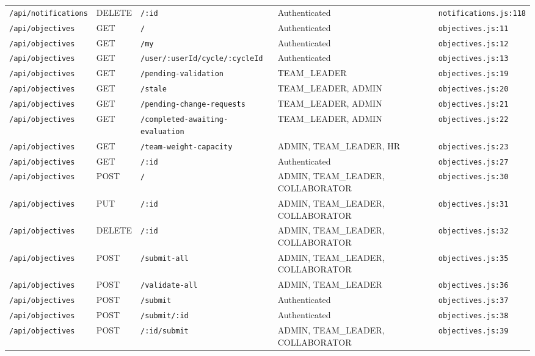 \begin{landscape}
\begin{longtable}{p{}p{}p{}p{}p{}}
\texttt{/api/notifications} & DELETE & \texttt{/:id} & Authenticated & \texttt{notifications.js:118}\\
\texttt{/api/objectives} & GET & \texttt{/} & Authenticated & \texttt{objectives.js:11}\\
\texttt{/api/objectives} & GET & \texttt{/my} & Authenticated & \texttt{objectives.js:12}\\
\texttt{/api/objectives} & GET & \texttt{/user/:userId/cycle/:cycleId} & Authenticated & \texttt{objectives.js:13}\\
\texttt{/api/objectives} & GET & \texttt{/pending-validation} & TEAM\_LEADER & \texttt{objectives.js:19}\\
\texttt{/api/objectives} & GET & \texttt{/stale} & TEAM\_LEADER,  ADMIN & \texttt{objectives.js:20}\\
\texttt{/api/objectives} & GET & \texttt{/pending-change-requests} & TEAM\_LEADER,  ADMIN & \texttt{objectives.js:21}\\
\texttt{/api/objectives} & GET & \texttt{/completed-awaiting-evaluation} & TEAM\_LEADER,  ADMIN & \texttt{objectives.js:22}\\
\texttt{/api/objectives} & GET & \texttt{/team-weight-capacity} & ADMIN,  TEAM\_LEADER,  HR & \texttt{objectives.js:23}\\
\texttt{/api/objectives} & GET & \texttt{/:id} & Authenticated & \texttt{objectives.js:27}\\
\texttt{/api/objectives} & POST & \texttt{/} & ADMIN,  TEAM\_LEADER,  COLLABORATOR & \texttt{objectives.js:30}\\
\texttt{/api/objectives} & PUT & \texttt{/:id} & ADMIN,  TEAM\_LEADER,  COLLABORATOR & \texttt{objectives.js:31}\\
\texttt{/api/objectives} & DELETE & \texttt{/:id} & ADMIN,  TEAM\_LEADER,  COLLABORATOR & \texttt{objectives.js:32}\\
\texttt{/api/objectives} & POST & \texttt{/submit-all} & ADMIN,  TEAM\_LEADER,  COLLABORATOR & \texttt{objectives.js:35}\\
\texttt{/api/objectives} & POST & \texttt{/validate-all} & ADMIN,  TEAM\_LEADER & \texttt{objectives.js:36}\\
\texttt{/api/objectives} & POST & \texttt{/submit} & Authenticated & \texttt{objectives.js:37}\\
\texttt{/api/objectives} & POST & \texttt{/submit/:id} & Authenticated & \texttt{objectives.js:38}\\
\texttt{/api/objectives} & POST & \texttt{/:id/submit} & ADMIN,  TEAM\_LEADER,  COLLABORATOR & \texttt{objectives.js:39}\\

\end{longtable}
\end{landscape}
